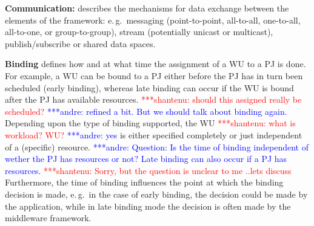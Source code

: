 \documentclass[conference,final]{IEEEtran}
\newcommand{\jhanote}[1]{ {\textcolor{red} { ***shantenu: #1 }}}
\newcommand{\alnote}[1]{ {\textcolor{blue} { ***andre: #1 }}}
\newcommand{\alnote}[1]{}
\newcommand{\jhanote}[1]{}
\begin{document}

\textbf{Communication:} describes the mechanisms for data exchange
between the elements of the framework: e.\,g.\ messaging 
(point-to-point, all-to-all, one-to-all, all-to-one, or
group-to-group), stream (potentially unicast or multicast),
publish/subscribe or shared data spaces. 
		

\textbf{Binding} defines how and at what time the assignment of a WU to a PJ is
done. For example, a WU can be bound to a PJ either before the PJ has in turn
been scheduled (early binding), whereas late binding can occur if the WU is
bound after the PJ has available resources. \jhanote{should this assigned really
be scheduled?} \alnote{refined a bit. But we should talk about binding again.}
Depending upon the type of binding supported, the WU \jhanote{what is workload?
WU?} \alnote{yes} is either specified completely or just independent of a
(specific) resource. \alnote{Question: Is the time of binding independent of
wether the PJ has resources or not? Late binding can also occur if a PJ has
resources.} \jhanote{Sorry, but the question is unclear to me ..lets discuss}
Furthermore, the time of binding influences the point at which the binding
decision is made, e.\,g.\ in the case of early binding, the decision could be
made by the application, while in late binding mode the decision is often made
by the middleware framework.
\end{document}
